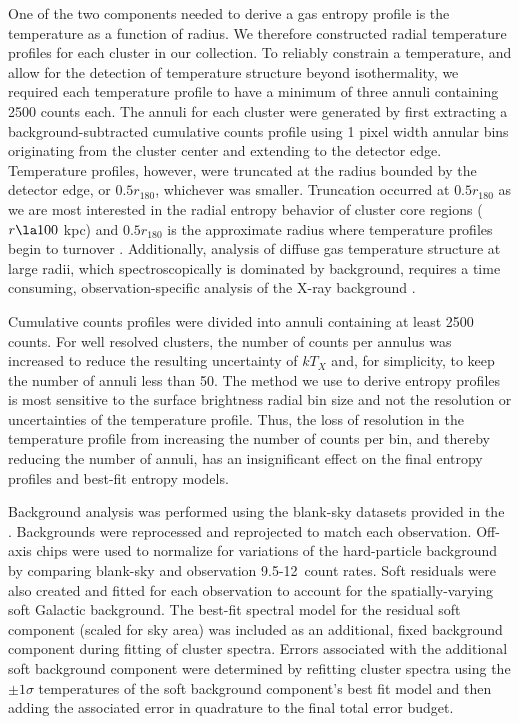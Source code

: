 \documentclass{emulateapj}
\begin{document}
One of the two components needed to derive a gas entropy profile is
the temperature as a function of radius. We therefore constructed
radial temperature profiles for each cluster in our collection. To
reliably constrain a temperature, and allow for the detection of
temperature structure beyond isothermality, we required each
temperature profile to have a minimum of three annuli containing 2500
counts each. The annuli for each cluster were generated by first
extracting a background-subtracted cumulative counts profile using 1
pixel width annular bins originating from the cluster center and
extending to the detector edge. Temperature profiles, however, were
truncated at the radius bounded by the detector edge, or $0.5
r_{180}$, whichever was smaller. Truncation occurred at $0.5 r_{180}$
as we are most interested in the radial entropy behavior of cluster
core regions ($r \la 100$ kpc) and $0.5 r_{180}$ is the approximate
radius where temperature profiles begin to turnover
\citep{2005ApJ...628..655V}.  Additionally, analysis of diffuse gas
temperature structure at large radii, which spectroscopically is
dominated by background, requires a time consuming,
observation-specific analysis of the X-ray background \cite[see][for a
  detailed discussion on this point]{minggroups}.

Cumulative counts profiles were divided into annuli containing at
least 2500 counts. For well resolved clusters, the number of counts
per annulus was increased to reduce the resulting uncertainty of
$kT_X$ and, for simplicity, to keep the number of annuli less than
50. The method we use to derive entropy profiles is most sensitive to
the surface brightness radial bin size and not the resolution or
uncertainties of the temperature profile. Thus, the loss of resolution
in the temperature profile from increasing the number of counts per
bin, and thereby reducing the number of annuli, has an insignificant
effect on the final entropy profiles and best-fit entropy models.

Background analysis was performed using the blank-sky datasets
provided in the \caldb. Backgrounds were reprocessed and reprojected
to match each observation. Off-axis chips were used to normalize for
variations of the hard-particle background by comparing blank-sky and
observation 9.5-12\keV\ count rates. Soft residuals
\citet[see][]{2005ApJ...628..655V} were also created
and fitted for each observation to account for the spatially-varying
soft Galactic background. The best-fit spectral model for the residual
soft component (scaled for sky area) was included as an additional,
fixed background component during fitting of cluster spectra. Errors
associated with the additional soft background component were
determined by refitting cluster spectra using the $\pm 1\sigma$
temperatures of the soft background component's best fit model and
then adding the associated error in quadrature to the final total
error budget.
\end{document}
